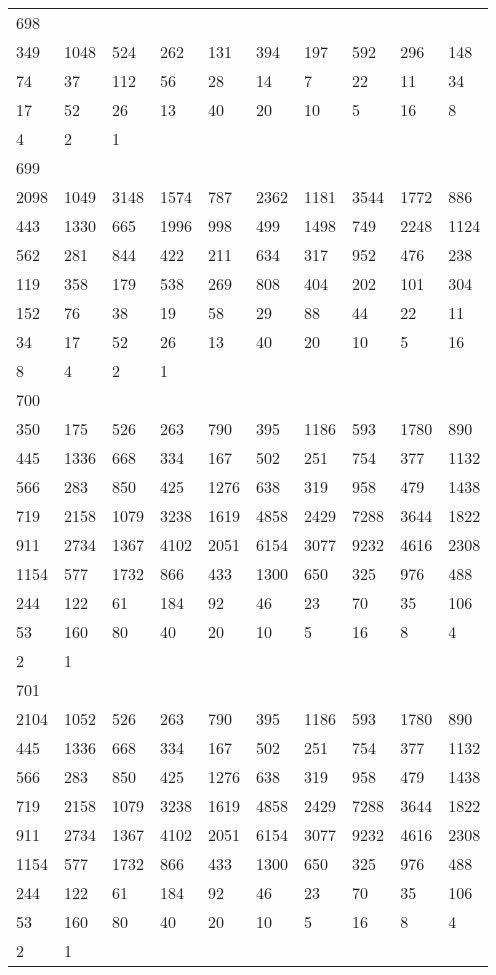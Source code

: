 \begin{longtable}{*{10}{l}}
698&&&&&&&&&\\
349& 1048& 524& 262& 131& 394& 197& 592& 296& 148\\
74& 37& 112& 56& 28& 14& 7& 22& 11& 34\\
17& 52& 26& 13& 40& 20& 10& 5& 16& 8\\
4& 2& 1& \\

699&&&&&&&&&\\
2098& 1049& 3148& 1574& 787& 2362& 1181& 3544& 1772& 886\\
443& 1330& 665& 1996& 998& 499& 1498& 749& 2248& 1124\\
562& 281& 844& 422& 211& 634& 317& 952& 476& 238\\
119& 358& 179& 538& 269& 808& 404& 202& 101& 304\\
152& 76& 38& 19& 58& 29& 88& 44& 22& 11\\
34& 17& 52& 26& 13& 40& 20& 10& 5& 16\\
8& 4& 2& 1& \\

700&&&&&&&&&\\
350& 175& 526& 263& 790& 395& 1186& 593& 1780& 890\\
445& 1336& 668& 334& 167& 502& 251& 754& 377& 1132\\
566& 283& 850& 425& 1276& 638& 319& 958& 479& 1438\\
719& 2158& 1079& 3238& 1619& 4858& 2429& 7288& 3644& 1822\\
911& 2734& 1367& 4102& 2051& 6154& 3077& 9232& 4616& 2308\\
1154& 577& 1732& 866& 433& 1300& 650& 325& 976& 488\\
244& 122& 61& 184& 92& 46& 23& 70& 35& 106\\
53& 160& 80& 40& 20& 10& 5& 16& 8& 4\\
2& 1& \\

701&&&&&&&&&\\
2104& 1052& 526& 263& 790& 395& 1186& 593& 1780& 890\\
445& 1336& 668& 334& 167& 502& 251& 754& 377& 1132\\
566& 283& 850& 425& 1276& 638& 319& 958& 479& 1438\\
719& 2158& 1079& 3238& 1619& 4858& 2429& 7288& 3644& 1822\\
911& 2734& 1367& 4102& 2051& 6154& 3077& 9232& 4616& 2308\\
1154& 577& 1732& 866& 433& 1300& 650& 325& 976& 488\\
244& 122& 61& 184& 92& 46& 23& 70& 35& 106\\
53& 160& 80& 40& 20& 10& 5& 16& 8& 4\\
2& 1& \\


\end{longtable}

